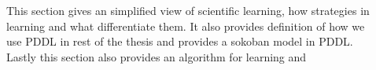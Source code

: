 \documentclass[Master.tex]{subfiles}
\begin{document}
 \begin{description}
 	\item[]
	 	This section gives an simplified view of scientific learning, how strategies in learning and what differentiate them. It also provides definition of how we use PDDL in rest of the thesis and provides a sokoban model in PDDL.
	 	Lastly this section also provides an algorithm for learning and 
	
	\item[]
	
	\item[]
	
	\item[]
	
	\item[]
	
	\item[]
 
\end{description}
	

%
%
%
%
%
%
%
\end{document}
